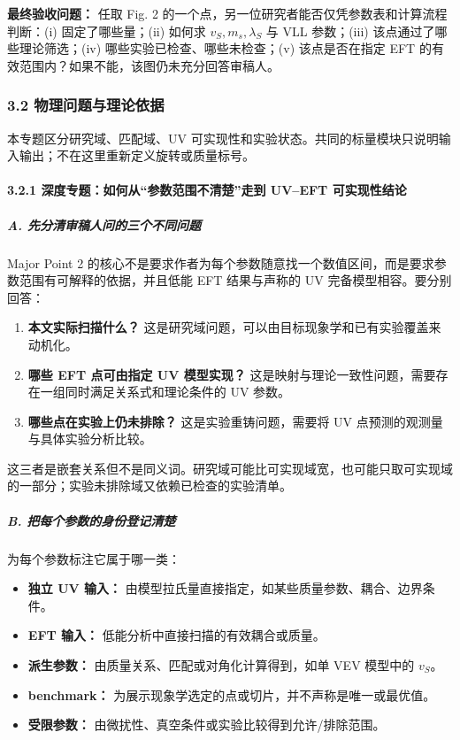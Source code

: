 \documentclass[
  chinese,
  UTF8]{ctexart}
\providecommand{\tightlist}{%
  \setlength{\itemsep}{0pt}\setlength{\parskip}{0pt}}
\begin{document}
\textbf{最终验收问题：} 任取 Fig. 2
的一个点，另一位研究者能否仅凭参数表和计算流程判断：(i)
固定了哪些量；(ii) 如何求 \(v_S,m_s,\lambda_S\) 与 VLL 参数；(iii)
该点通过了哪些理论筛选；(iv) 哪些实验已检查、哪些未检查；(v)
该点是否在指定 EFT 的有效范围内？如果不能，该图仍未充分回答审稿人。

\subsubsection{3.2 物理问题与理论依据}\label{major-2-step-2}

本专题区分研究域、匹配域、UV
可实现性和实验状态。共同的标量模块只说明输入输出；不在这里重新定义旋转或质量标号。

\paragraph{3.2.1 深度专题：如何从``参数范围不清楚''走到 UV--EFT
可实现性结论}\label{ux6df1ux5ea6ux4e13ux9898ux5982ux4f55ux4eceux53c2ux6570ux8303ux56f4ux4e0dux6e05ux695aux8d70ux5230-uveft-ux53efux5b9eux73b0ux6027ux7ed3ux8bba}

\subparagraph{A.
先分清审稿人问的三个不同问题}\label{a.-ux5148ux5206ux6e05ux5ba1ux7a3fux4ebaux95eeux7684ux4e09ux4e2aux4e0dux540cux95eeux9898}

Major Point 2
的核心不是要求作者为每个参数随意找一个数值区间，而是要求参数范围有可解释的依据，并且低能
EFT 结果与声称的 UV 完备模型相容。要分别回答：

\begin{enumerate}
\def\labelenumi{\arabic{enumi}.}
\tightlist
\item
  \textbf{本文实际扫描什么？}
  这是研究域问题，可以由目标现象学和已有实验覆盖来动机化。
\item
  \textbf{哪些 EFT 点可由指定 UV 模型实现？}
  这是映射与理论一致性问题，需要存在一组同时满足关系式和理论条件的 UV
  参数。
\item
  \textbf{哪些点在实验上仍未排除？} 这是实验重铸问题，需要将 UV
  点预测的观测量与具体实验分析比较。
\end{enumerate}

这三者是嵌套关系但不是同义词。研究域可能比可实现域宽，也可能只取可实现域的一部分；实验未排除域又依赖已检查的实验清单。

\subparagraph{B.
把每个参数的身份登记清楚}\label{b.-ux628aux6bcfux4e2aux53c2ux6570ux7684ux8eabux4efdux767bux8bb0ux6e05ux695a}

为每个参数标注它属于哪一类：

\begin{itemize}
\tightlist
\item
  \textbf{独立 UV 输入：}
  由模型拉氏量直接指定，如某些质量参数、耦合、边界条件。
\item
  \textbf{EFT 输入：} 低能分析中直接扫描的有效耦合或质量。
\item
  \textbf{派生参数：} 由质量关系、匹配或对角化计算得到，如单 VEV
  模型中的 \(v_S\)。
\item
  \textbf{benchmark：}
  为展示现象学选定的点或切片，并不声称是唯一或最优值。
\item
  \textbf{受限参数：} 由微扰性、真空条件或实验比较得到允许/排除范围。
\end{itemize}
\end{document}
